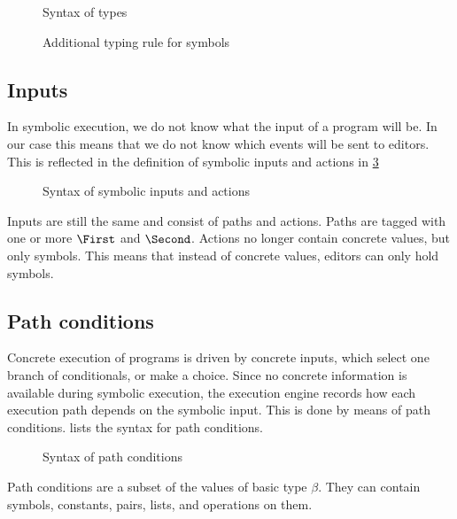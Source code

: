 \begin{figure}[h]
  \small
  \caption{Syntax of \TOPHAT types}
  \label{fig:syntaxtypes}
\end{figure}

\begin{figure}[h]
  \small
  \caption{Additional typing rule for symbols}
  \label{fig:typingsymbol}
\end{figure}



\subsection{Inputs}

In symbolic execution, we do not know what the input of a program will be.
In our case this means that we do not know which events will be sent to editors.
This is reflected in the definition of symbolic inputs and actions in \cref{fig:syntaxinputs}

\begin{figure}[h]
  \small
  \caption{Syntax of symbolic inputs and actions}
  \label{fig:syntaxinputs}
\end{figure}

Inputs are still the same and consist of paths and actions.
Paths are tagged with one or more $\First$ and $\Second$.
Actions no longer contain concrete values, but only symbols.
This means that instead of concrete values, editors can only hold symbols.



\subsection{Path conditions}

Concrete execution of \TOPHAT programs is driven by concrete inputs, which select one branch of conditionals, or make a choice.
Since no concrete information is available during symbolic execution, the execution engine records how each execution path depends on the symbolic input.
This is done by means of path conditions.
 lists the syntax for path conditions.

\begin{figure}[h]
  \small
  \caption{Syntax of path conditions}
  \label{fig:syntaxpredicates}
\end{figure}

Path conditions are a subset of the values of basic type $\beta$.
They can contain symbols, constants, pairs, lists, and operations on them.
